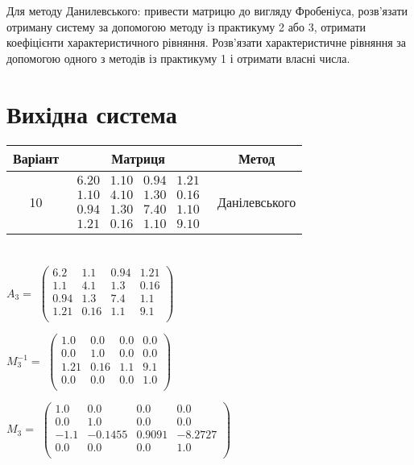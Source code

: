 \documentclass{article}
\begin{document}
    Для методу Данилевського: привести матрицю до вигляду Фробеніуса, розв’язати отриману систему за допомогою методу із практикуму 2 або 3, отримати коефіцієнти характеристичного рівняння. Розв’язати характеристичне рівняння за допомогою одного з методів із практикуму 1 і отримати власні числа.
    \section{Вихідна система}
    \begin{tabular}{ |c|c|c| }
        \hline
        Варіант & Матриця & Метод \\ 
        \hline
        10
        &
        $\begin{matrix}
            6.20 & 1.10 & 0.94 & 1.21\\
            1.10 & 4.10 & 1.30 & 0.16\\
            0.94 & 1.30 & 7.40 & 1.10\\
            1.21 & 0.16 & 1.10 & 9.10
        \end{matrix}$
        &
        Данілевського
        \\ 
        \hline
    \end{tabular}

    \section{}
    $A_3 = $
    $
    \left(\begin{matrix}
        6.2 & 1.1 & 0.94 & 1.21 \\
        1.1 & 4.1 & 1.3 & 0.16 \\
        0.94 & 1.3 & 7.4 & 1.1 \\
        1.21 & 0.16 & 1.1 & 9.1 \\
    \end{matrix}\right)
    $

    $M^{-1}_3 = $
    $
    \left(\begin{matrix}
        1.0 & 0.0 & 0.0 & 0.0 \\
        0.0 & 1.0 & 0.0 & 0.0 \\
        1.21 & 0.16 & 1.1 & 9.1 \\
        0.0 & 0.0 & 0.0 & 1.0 \\
    \end{matrix}\right)
    $

    $M_3 = $
    $
    \left(\begin{matrix}
        1.0 & 0.0 & 0.0 & 0.0 \\
        0.0 & 1.0 & 0.0 & 0.0 \\
        -1.1 & -0.1455 & 0.9091 & -8.2727 \\
        0.0 & 0.0 & 0.0 & 1.0 \\
    \end{matrix}\right)
    $
\end{document}
